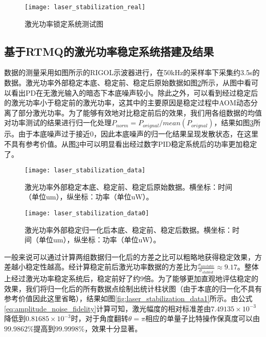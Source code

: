 \begin{figure}
    \centering
    \caption[激光功率锁定系统测试图]{激光功率锁定系统测试图\label{fig:laser_stabilization_real}}
    \texttt{[image: laser\_stabilization\_real]}
\end{figure}


\subsection[基于RTMQ的激光功率稳定系统搭建及结果]{基于RTMQ的激光功率稳定系统搭建及结果}

数据的测量采用如图所示的RIGOL示波器进行，在50kHz的采样率下采集约3.5s的数据。激光功率外部稳定本底、稳定前、稳定后原始数据如图\ref{fig:laser_stabilization_data}所示，从图中看可以看出PD在无激光输入的暗态下本底噪声较小。除此之外，可以看到经过稳定后的激光功率小于稳定前的激光功率，这其中的主要原因是稳定过程中AOM动态分离了部分激光功率。为了能够有效地对比稳定前后的效果，我们用各组数据的均值对功率测试的结果进行归一化处理$P_{norm}=P_{orignal}/mean(P_{orignal})$，结果如图\ref{fig:laser_stabilization_data0}所示。由于本底噪声过于接近0，因此本底噪声的归一化结果呈现发散状态，在这里不具有参考价值。从图\ref{fig:laser_stabilization_data0}中可以明显看出经过数字PID稳定系统后的功率更加稳定了。

\begin{figure}
    \centering
    \caption[激光功率外部稳定原始数据]{激光功率外部稳定本底、稳定前、稳定后原始数据。横坐标：时间（单位um），纵坐标：功率（单位uW）。\label{fig:laser_stabilization_data}}
    \texttt{[image: laser\_stabilization\_data]}
\end{figure}

\begin{figure}
    \centering
    \caption[激光功率外部稳定归一化后数据]{激光功率外部稳定归一化后本底、稳定前、稳定后数据。横坐标：时间（单位um），纵坐标：功率（单位uW）。\label{fig:laser_stabilization_data0}}
    \texttt{[image: laser\_stabilization\_data0]}
\end{figure}

一般来说可以通过计算两组数据归一化后的方差之比可以粗略地获得稳定效果，方差越小稳定性越高。经计算稳定前后激光功率数据的方差比为$\frac{\sigma_{unstable}}{\sigma_{stabled}}\approx 9.17$。整体上经过激光功率稳定系统后，稳定前好了约9倍。为了能够更加直观地评估稳定的效果，我们将归一化后的所有数据点绘制出统计柱状图（由于本底的归一化不具有参考价值因此这里省略），结果如图\ref{fig:laser_stabilization_data1}所示。由公式\eqref{eq:amplitude_noise_fidelity}计算可知，激光幅度的相对标准差由$7.49135\times 10^{-3}$降低到$0.81685\times 10^{-3}$时，对于角度翻转$\theta=\pi$相应的单量子比特操作保真度可以由$99.9862\%$提高到$99.9998\%$，效果十分显著。


